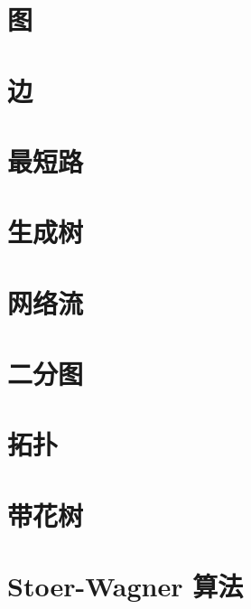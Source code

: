 \section{图}


\section{边}


\section{最短路}


\section{生成树}


\section{网络流}


\section{二分图}


\section{拓扑}


\section{带花树}


\section{Stoer-Wagner 算法}

